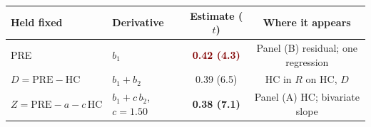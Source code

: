 \begin{tabular}{@{}llcc@{}}
\toprule
Held fixed & Derivative & Estimate ($t$) & Where it appears \\
\midrule
PRE & $b_1$ & \textcolor{Maroon}{\bfseries 0.42 (4.3)} & Panel (B) residual; one regression \\
$D = \mathrm{PRE} - \mathrm{HC}$ & $b_1 + b_2$ & 0.39 (6.5) & HC in $R$ on HC, $D$ \\
$Z = \mathrm{PRE} - a - c\,\mathrm{HC}$ & $b_1 + c\,b_2$, $c = 1.50$ & \textcolor{DeepNavy}{\bfseries 0.38 (7.1)} & Panel (A) HC; bivariate slope \\
\bottomrule
\end{tabular}
